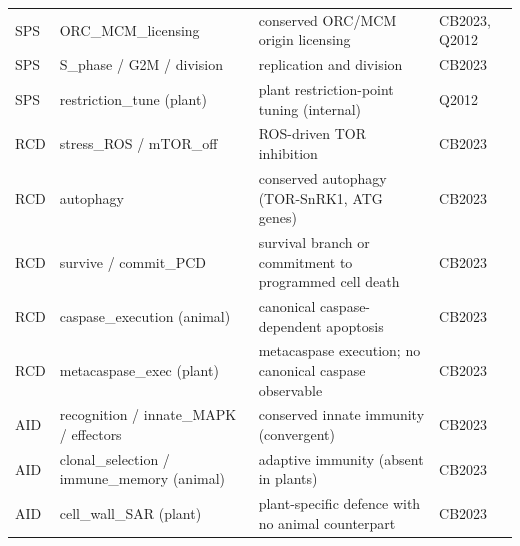 \begin{longtable}{@{}p{1.4cm}p{4.5cm}p{7.2cm}p{1.8cm}@{}}
SPS & ORC\_MCM\_licensing & conserved ORC/MCM origin licensing & CB2023, Q2012 \\
SPS & S\_phase / G2M / division & replication and division & CB2023 \\
SPS & restriction\_tune (plant) & plant restriction-point tuning (internal) & Q2012 \\
RCD & stress\_ROS / mTOR\_off & ROS-driven TOR inhibition & CB2023 \\
RCD & autophagy & conserved autophagy (TOR-SnRK1, ATG genes) & CB2023 \\
RCD & survive / commit\_PCD & survival branch or commitment to programmed cell death & CB2023 \\
RCD & caspase\_execution (animal) & canonical caspase-dependent apoptosis & CB2023 \\
RCD & metacaspase\_exec (plant) & metacaspase execution; no canonical caspase observable & CB2023 \\
AID & recognition / innate\_MAPK / effectors & conserved innate immunity (convergent) & CB2023 \\
AID & clonal\_selection / immune\_memory (animal) & adaptive immunity (absent in plants) & CB2023 \\
AID & cell\_wall\_SAR (plant) & plant-specific defence with no animal counterpart & CB2023 \\
\bottomrule
\end{longtable}
